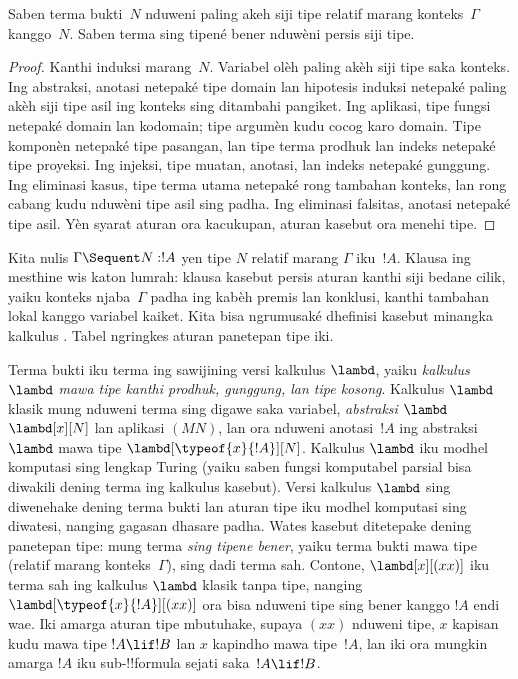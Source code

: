 \documentclass[../../../include/open-logic-section]{subfiles}
\begin{document}
\begin{prop}
Saben terma bukti~$N$ nduweni paling akeh siji tipe relatif marang
konteks~$\Gamma$ kanggo~$N$. Saben terma sing tipené bener nduwèni
persis siji tipe.
\end{prop}

\begin{proof}
  Kanthi induksi marang~$N$. Variabel olèh paling akèh siji tipe
  saka konteks. Ing abstraksi, anotasi netepaké tipe domain lan
  hipotesis induksi netepaké paling akèh siji tipe asil ing konteks
  sing ditambahi pangiket. Ing aplikasi, tipe fungsi netepaké
  domain lan kodomain; tipe argumèn kudu cocog karo domain.
  Tipe komponèn netepaké tipe pasangan, lan tipe terma prodhuk
  lan indeks netepaké tipe proyeksi. Ing injeksi, tipe muatan,
  anotasi, lan indeks netepaké gunggung. Ing eliminasi kasus,
  tipe terma utama netepaké rong tambahan konteks, lan rong
  cabang kudu nduwèni tipe asil sing padha. Ing eliminasi
  falsitas, anotasi netepaké tipe asil. Yèn syarat aturan
  ora kacukupan, aturan kasebut ora menehi tipe.
\end{proof}

Kita nulis $\Gamma \Sequent N : !A$ yen tipe $N$ relatif marang
$\Gamma$ iku~$!A$. Klausa ing  mesthine wis katon
lumrah: klausa kasebut persis aturan  kanthi siji bedane
cilik, yaiku konteks njaba~$\Gamma$ padha ing kabèh premis lan konklusi,
kanthi tambahan lokal kanggo variabel kaiket. Kita bisa ngrumusaké
dhefinisi kasebut minangka kalkulus . Tabel  ngringkes aturan panetepan tipe iki.



Terma bukti iku terma ing sawijining versi kalkulus $\lambd$, yaiku
\emph{kalkulus $\lambd$ mawa tipe kanthi prodhuk, gunggung, lan tipe kosong}.
Kalkulus $\lambd$ klasik mung nduweni terma sing digawe saka variabel,
\emph{abstraksi $\lambd$}~$\lambd[x][N]$ lan aplikasi $(MN)$,
lan ora nduweni anotasi~$!A$ ing abstraksi $\lambd$ mawa tipe
$\lambd[\typeof{x}{!A}][N]$. Kalkulus $\lambd$ iku modhel komputasi
sing lengkap Turing (yaiku saben fungsi komputabel parsial bisa
diwakili dening terma ing kalkulus kasebut). Versi kalkulus $\lambd$
sing diwenehake dening terma bukti lan aturan tipe iku modhel
komputasi sing diwatesi, nanging gagasan dhasare padha. Wates kasebut
ditetepake dening panetepan tipe: mung terma \emph{sing tipene bener},
yaiku terma bukti mawa tipe (relatif marang konteks~$\Gamma$), sing
dadi terma sah. Contone, $\lambd[x][(xx)]$ iku terma sah ing kalkulus
$\lambd$ klasik tanpa tipe, nanging $\lambd[\typeof{x}{!A}][(xx)]$
ora bisa nduweni tipe sing bener kanggo $!A$ endi wae. Iki amarga
aturan tipe mbutuhake, supaya $(xx)$ nduweni tipe, $x$ kapisan kudu
mawa tipe $!A \lif !B$ lan $x$ kapindho mawa tipe~$!A$, lan iki
ora mungkin amarga $!A$ iku sub-!!{formula} sejati saka~$!A \lif !B$.
\end{document}
